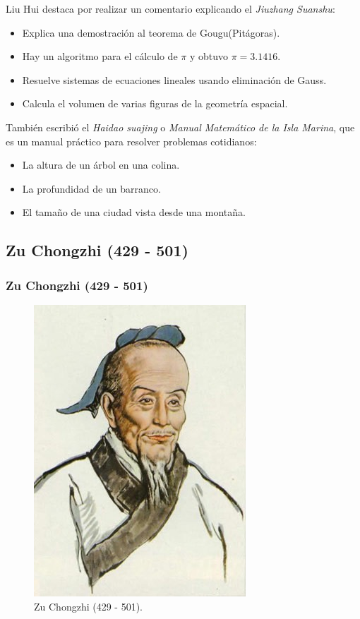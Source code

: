 \documentclass[12pt, aspectratio=169]{beamer} %
\begin{document}
		\begin{frame}
			Liu Hui destaca por realizar un comentario explicando el \textit{Jiuzhang Suanshu}:

			\begin{itemize}
				\item Explica una demostración al teorema de Gougu(Pitágoras).
				\item Hay un algoritmo para el cálculo de $\pi$ y obtuvo $\pi = 3.1416$.
				\item Resuelve sistemas de ecuaciones lineales usando eliminación de Gauss.
				\item Calcula el volumen de varias figuras de la geometría espacial.
			\end{itemize}
	
			\pause

			También escribió el \textit{Haidao suajing} o \textit{Manual Matemático de la Isla Marina}, que es un manual
			práctico para resolver problemas cotidianos:
			
			\begin{itemize}
				\item La altura de un árbol en una colina.
				\item La profundidad de un barranco.
				\item El tamaño de una ciudad vista desde una montaña.
			\end{itemize}	
		\end{frame}

	\subsection{Zu Chongzhi (429 - 501)}
		\begin{frame}
			\frametitle{Zu Chongzhi (429 - 501)}
			\begin{figure}
				\centering
				\includegraphics[width = .25\linewidth]{zu_chongzhi.jpg}
				\caption{Zu Chongzhi (429 - 501).}
			\end{figure}
		\end{frame}
					
\end{document}
